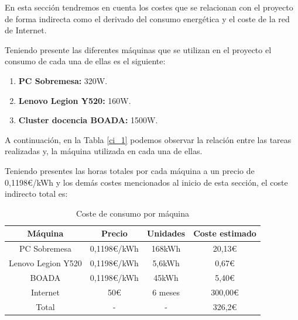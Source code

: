 \documentclass[titlepage,12pt]{report}
\begin{document}
En esta sección tendremos en cuenta los costes que se relacionan con el proyecto de forma indirecta como el derivado del consumo energética y el coste de la red de Internet.

Teniendo presente las diferentes máquinas que se utilizan en el proyecto el consumo de cada una de ellas es el siguiente:

\begin{enumerate}
	\item \textbf{PC Sobremesa:} 320W.
	\item \textbf{Lenovo Legion Y520:} 160W.
	\item \textbf{Cluster docencia BOADA:} 1500W.
\end{enumerate}

A continuación, en la Tabla \ref{ci_1} podemos observar la relación entre las tareas realizadas y, la máquina utilizada en cada una de ellas.

\begin{table}[H]
	\centering
	\caption{Horas por tarea y recurso}
	\label{ci_1}
\end{table}

Teniendo presentes las horas totales por cada máquina a un precio de 0,1198€/kWh y los demás costes mencionados al inicio de esta sección, el coste indirecto total es:

\begin{table}[H]
	\centering
	\begin{tabular}{|c|c|c|c|}
		\hline
		\textbf{Máquina} & \textbf{Precio} & \textbf{Unidades} & \textbf{Coste estimado} \\ \hline \hline
		PC Sobremesa 			& 0,1198€/kWh & 168kWh 	& 20,13€ 	\\ \hline
		Lenovo Legion Y520 		& 0,1198€/kWh & 5,6kWh 	& 0,67€ 	\\ \hline
		BOADA 					& 0,1198€/kWh & 45kWh 	& 5,40€ 	\\ \hline 
		Internet				& 50€		  & 6 meses	& 300,00€ 	\\ \hline \hline
		Total 					& - 		  & -		& 326,2€	\\ \hline
	\end{tabular}
	\caption{Coste de consumo por máquina}
	\label{ci2}
\end{table}
\end{document}
